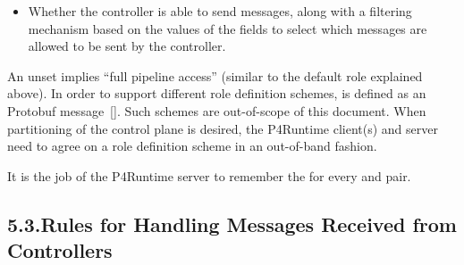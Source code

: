 \documentclass[11pt]{article}
\begin{document}
{\begin{itemize}[noitemsep,topsep=\mdcompacttopsep]
\item{}Whether the controller is able to send  messages, along with a
filtering mechanism based on the values of the  fields to
select which  messages are allowed to be sent by the controller.%
\end{itemize}%

\noindent{}An unset  implies \textquotedblleft{}full pipeline access\textquotedblright{} (similar to the default
role explained above). In order to support different role definition schemes,
 is defined as an  Protobuf message~[]. Such schemes
are out-of-scope of this document. When partitioning of the control plane is
desired, the P4Runtime client(s) and server need to agree on a role definition
scheme in an out-of-band fashion.%

It is the job of the P4Runtime server to remember the  for every
 and  pair.%

\subsection{5.3.\hspace*{0.5em}Rules for Handling  Messages Received from Controllers}\label{sec-mastership-updates}%

\begin{enumerate}%


\end{enumerate}}
\end{document}
